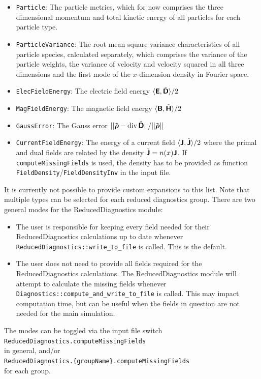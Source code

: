 \documentclass[11pt]{article}
\begin{document}
\begin{itemize}
    \item \texttt{Particle}: The particle metrics, which for now comprises the three dimensional momentum and total kinetic energy of all particles for each particle type.
    \item \texttt{ParticleVariance}: The root mean square variance characteristics of all particle species, calculated separately, which comprises the variance of the particle weights, the variance of velocity and velocity squared in all three dimensions and the first mode of the $x$-dimension density in Fourier space.
    \item \texttt{ElecFieldEnergy}: The electric field energy $\langle {\boldsymbol{\rm \mathsf{E}}}, \tilde{{\boldsymbol {\rm \mathsf{D}}}}\rangle/2$
    \item \texttt{MagFieldEnergy}: The magnetic field energy $\langle {\boldsymbol{\rm \mathsf{B}}}, \tilde{{\boldsymbol {\rm \mathsf{H}}}}\rangle/2$
    \item \texttt{GaussError}: The Gauss error $||\tilde{{\boldsymbol {\rm \mathsf{\rho}}}}-\operatorname{div} \tilde{{\boldsymbol {\rm \mathsf{D}}}}||/||\tilde{{\boldsymbol {\rm \mathsf{\rho}}}}||$
    \item \texttt{CurrentFieldEnergy}: The energy of a current field $\langle {\boldsymbol{\rm \mathsf{J}}}, \tilde{{\boldsymbol {\rm \mathsf{J}}}}\rangle/2$ where the primal and dual fields are related by the density $\tilde{{\boldsymbol {\rm \mathsf{J}}}} = n(x) {\boldsymbol {\rm \mathsf{J}}}$. If \lstinline|computeMissingFields| is used, the density has to be provided as function \lstinline|FieldDensity|/\lstinline|FieldDensityInv| in the input file.
\end{itemize}
It is currently not possible to provide custom expansions to this list.
Note that multiple types can be selected for each reduced diagnostics group.
There are two general modes for the ReducedDiagnostics module:
\begin{itemize}
    \item The user is responsible for keeping every field needed for their ReducedDiagnostics calculations up to date whenever \lstinline|ReducedDiagnostics::write_to_file| is called. This is the default.
    \item The user does not need to provide all fields required for the ReducedDiagnostics calculations. The ReducedDiagnostics module will attempt to calculate the missing fields whenever \lstinline|Diagnostics::compute_and_write_to_file| is called. This may impact computation time, but can be useful when the fields in question are not needed for the main simulation.
\end{itemize}
The modes can be toggled via the input file switch
\\\lstinline|ReducedDiagnostics.computeMissingFields|\\
in general, and/or
\\\lstinline|ReducedDiagnostics.{groupName}.computeMissingFields|\\
for each group.
\end{document}
